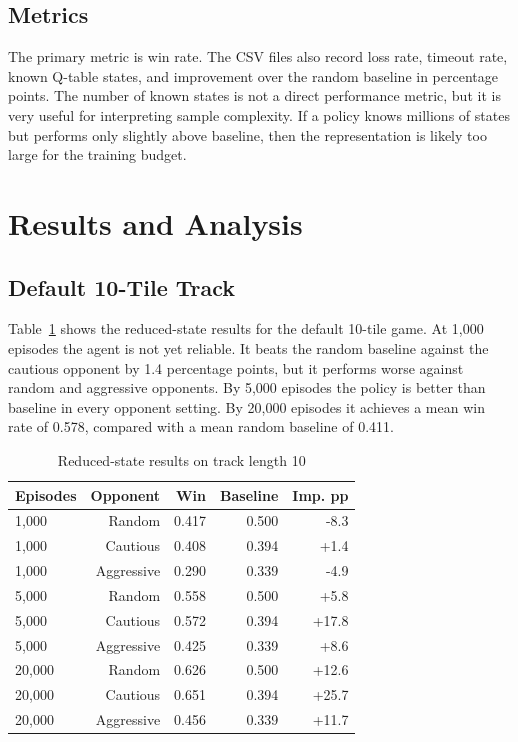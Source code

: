 \documentclass[conference]{IEEEtran}
\begin{document}
\subsection{Metrics}

The primary metric is win rate. The CSV files also record loss rate, timeout rate,
known Q-table states, and improvement over the random baseline in percentage
points. The number of known states is not a direct performance metric, but it is
very useful for interpreting sample complexity. If a policy knows millions of
states but performs only slightly above baseline, then the representation is likely
too large for the training budget.

\section{Results and Analysis}

\subsection{Default 10-Tile Track}

Table~\ref{tab:l10reduced} shows the reduced-state results for the default
10-tile game. At 1,000 episodes the agent is not yet reliable. It beats the random
baseline against the cautious opponent by 1.4 percentage points, but it performs
worse against random and aggressive opponents. By 5,000 episodes the policy is
better than baseline in every opponent setting. By 20,000 episodes it achieves a
mean win rate of 0.578, compared with a mean random baseline of 0.411.

\begin{table}[h]
\centering
\caption{Reduced-state results on track length 10}
\label{tab:l10reduced}
\begin{tabular}{lrrrr}
\toprule
Episodes & Opponent & Win & Baseline & Imp. pp \\
\midrule
1,000 & Random & 0.417 & 0.500 & -8.3 \\
1,000 & Cautious & 0.408 & 0.394 & +1.4 \\
1,000 & Aggressive & 0.290 & 0.339 & -4.9 \\
5,000 & Random & 0.558 & 0.500 & +5.8 \\
5,000 & Cautious & 0.572 & 0.394 & +17.8 \\
5,000 & Aggressive & 0.425 & 0.339 & +8.6 \\
20,000 & Random & 0.626 & 0.500 & +12.6 \\
20,000 & Cautious & 0.651 & 0.394 & +25.7 \\
20,000 & Aggressive & 0.456 & 0.339 & +11.7 \\
\bottomrule
\end{tabular}
\end{table}
\end{document}
